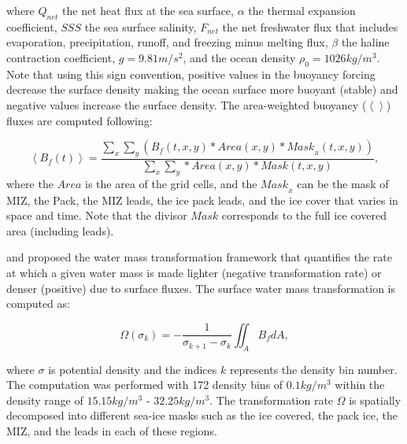 where $Q_{net}$ the net heat flux at the sea surface, $\alpha$ the thermal expansion coefficient, $SSS$ the sea surface salinity, $F_{net}$ the net freshwater flux that includes evaporation, precipitation, runoff, and freezing minus melting flux, $\beta$ the haline contraction coefficient, $g = 9.81 m/s^2$, and the ocean density $\rho_0 = 1026 kg/m^3$. 
Note that using this sign convention, positive values in the buoyancy forcing decrease the surface density making the ocean surface more buoyant (stable) and negative values increase the surface density. The area-weighted buoyancy ($ \left<\right>$) fluxes are computed following:

\begin{equation}
    \left<B_f (t)\right>  = \frac{\sum_x \sum_y \left( B_f(t,x,y) * Area(x,y) * Mask_{_R}(t,x,y)\right)}{\sum_x \sum_y * Area(x,y) * Mask(t,x,y)},
\end{equation}
where the $Area$ is the area of the grid cells, and the $Mask_{_R}$ can be the mask of MIZ, the Pack, the MIZ leads, the ice pack leads, and the ice cover that varies in space and time. Note that the divisor $Mask$ corresponds to the full ice covered area (including leads).

\citet{Nurser_WMT_1999} and  \citet{Walin_WMT_1982} proposed the water mass transformation framework that quantifies the rate at which a given water mass is made lighter (negative transformation rate) or denser (positive) due to surface fluxes. The surface water mass transformation is computed as:

\begin{equation}
    \Omega(\sigma_k) = - \frac{1}{\sigma_{k+1}-\sigma_k}\iint_AB_fdA,
\end{equation}

where $\sigma$ is potential density and the indices $k$ represents the density bin number. The computation was performed with 172 density bins of $0.1 kg/m^3$ within the density range of $15.15 kg/m^3$ - $32.25 kg/m^3$. The transformation rate $\Omega$ is spatially decomposed into different sea-ice masks such as the ice covered, the pack ice, the MIZ, and the leads in each of these regions. 